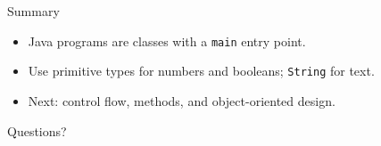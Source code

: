 \begin{frame}{Summary}
  \begin{itemize}\setlength\itemsep{0.4em}
    \item Java programs are classes with a \texttt{main} entry point.
    \item Use primitive types for numbers and booleans; \texttt{String} for text.
    \item Next: control flow, methods, and object-oriented design.
  \end{itemize}

  \vfill
  {\small\color{acGray}Questions?}
\end{frame}
